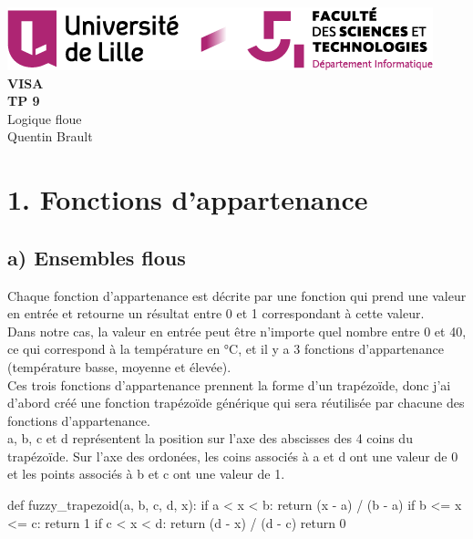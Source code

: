\documentclass[11pt]{report}
\begin{document}
\begin{titlepage}
	\centering
	\includegraphics[scale=0.8]{logo}\\
	\vspace{5cm}
	{\Huge{ \bf{VISA}}}\\
	\vspace{0.5cm}
   	{\Huge{\bf {TP 9}}}\\
	\vspace{2cm}
   	{\huge{Logique floue}}\\
	\vspace{3cm}
   	{\large{Quentin Brault}}
\end{titlepage}


\section*{1. Fonctions d'appartenance}

\subsection*{a) Ensembles flous}
Chaque fonction d'appartenance est décrite par une fonction qui prend une valeur en entrée et retourne un résultat entre 0 et 1 correspondant à cette valeur.\\
Dans notre cas, la valeur en entrée peut être n'importe quel nombre entre 0 et 40, ce qui correspond à la température en °C, et il y a 3 fonctions d'appartenance (température basse, moyenne et élevée).\\
Ces trois fonctions d'appartenance prennent la forme d'un trapézoïde, donc j'ai d'abord créé une fonction trapézoïde générique qui sera réutilisée par chacune des fonctions d'appartenance.\\
a, b, c et d représentent la position sur l'axe des abscisses des 4 coins du trapézoïde. Sur l'axe des ordonées, les coins associés à a et d ont une valeur de 0 et les points associés à b et c ont une valeur de 1.\\
\begin{pythoncode}
def fuzzy_trapezoid(a, b, c, d, x):
	if a < x < b:
		return (x - a) / (b - a)
	if b <= x <= c:
		return 1
	if c < x < d:
		return (d - x) / (d - c)
	return 0
\end{pythoncode}
\end{document}
